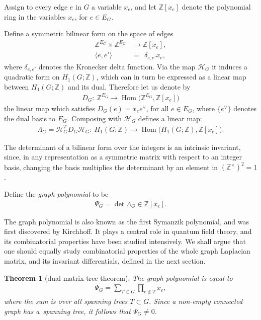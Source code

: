 \documentclass[pdftex]{sigma}%
\newtheorem{thm}{Theorem}[section]
\numberwithin{equation}{section}
\newcommand{\To}{\longrightarrow}
\newcommand{\Z}{\mathbb Z}
\newcommand{\0}{\color{blue}{\mathsf{0}}}
\begin{document}
\begin{defn} Assign to every edge $e$ in $G$ a variable $x_e$, and let $\Z[x_e]$ denote the polynomial ring in the variables $x_e$, for $e\in E_G$.

Define a symmetric bilinear form on the space of edges
\begin{align*}
\Z^{E_G} \times \Z^{E_G} & \To \Z[x_e],
\\
\langle e, e'\rangle &= \ \ \delta_{e,e'} x_e,
\end{align*}
where $\delta_{e,e'}$ denotes the Kronecker delta function.
Via the map $\mathcal{H}_G$ it induces a quadratic form on $H_1(G;\Z)$, which can in turn be expressed as a linear map between $H_1(G;\Z)$ and its dual. Therefore
let us denote by
\begin{gather*}
D_G\colon\ \Z^{E_G} \To \operatorname{Hom}\big(\Z^{E_G}, \Z[x_e]\big)
\end{gather*}
the linear map which satisfies $D_G (e) = x_e e^{\!\vee}$, for all $e\in E_G$, where $\{e^{\!\vee}\}$ denotes the dual basis to $E_G$.
Composing with $\mathcal{H}_G$ defines a linear map:
\begin{gather*}
\Lambda_G = \mathcal{H}^T_G D_G \mathcal{H}_G \colon \ H_1(G; \Z) \To \operatorname{Hom}\big(H_1(G;\Z),\Z[x_e]\big) .
\end{gather*}
 \end{defn}
 The determinant of a bilinear form over the integers is an intrinsic invariant, since, in any representation as a symmetric matrix with respect to an integer basis, changing the basis multiplies the determinant by an element in $(\Z^{\times})^2=1$.
 \begin{defn}
 Define the \emph{graph polynomial} to be
 \begin{gather*}
 \Psi_G = \det \Lambda_G \in \Z[x_e].
 \end{gather*}
 \end{defn}
 The graph polynomial is also known as the first Symanzik polynomial, and was first discovered by Kirchhoff. It plays a central role in quantum field theory, and its combinatorial properties have been studied intensively. We shall argue that one should equally study combinatorial properties of the whole graph Laplacian matrix, and its invariant differentials, defined in the next section.

 \begin{thm}[{dual matrix tree theorem}] \label{thm: MatrixTree}
 The graph polynomial is equal to
 \begin{gather*}
 \Psi_G = \sum_{T \subset G} \prod_{e\notin T} x_e,
 \end{gather*}
 where the sum is over all spanning trees $T\subset G.$ Since a non-empty connected graph has a~spanning tree, it follows that $\Psi_G \neq 0$.
 \end{thm}
\end{document}
